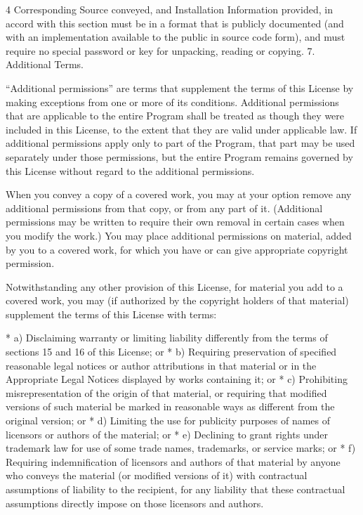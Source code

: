 \documentclass[fontsize=11pt,paper=A4,BCOR=12mm,DIV=13,open=any,listof=totoc,toc=flat]{scrbook}
\begin{document}
{\begin{multicols}{4}
Corresponding Source conveyed, and Installation Information provided, in accord with this section must be in a format that is publicly documented (and with an implementation available to the public in source code form), and must require no special password or key for unpacking, reading or copying.
7. Additional Terms.

“Additional permissions” are terms that supplement the terms of this License by making exceptions from one or more of its conditions. Additional permissions that are applicable to the entire Program shall be treated as though they were included in this License, to the extent that they are valid under applicable law. If additional permissions apply only to part of the Program, that part may be used separately under those permissions, but the entire Program remains governed by this License without regard to the additional permissions.

When you convey a copy of a covered work, you may at your option remove any additional permissions from that copy, or from any part of it. (Additional permissions may be written to require their own removal in certain cases when you modify the work.) You may place additional permissions on material, added by you to a covered work, for which you have or can give appropriate copyright permission.

Notwithstanding any other provision of this License, for material you add to a covered work, you may (if authorized by the copyright holders of that material) supplement the terms of this License with terms:

    * a) Disclaiming warranty or limiting liability differently from the terms of sections 15 and 16 of this License; or
    * b) Requiring preservation of specified reasonable legal notices or author attributions in that material or in the Appropriate Legal Notices displayed by works containing it; or
    * c) Prohibiting misrepresentation of the origin of that material, or requiring that modified versions of such material be marked in reasonable ways as different from the original version; or
    * d) Limiting the use for publicity purposes of names of licensors or authors of the material; or
    * e) Declining to grant rights under trademark law for use of some trade names, trademarks, or service marks; or
    * f) Requiring indemnification of licensors and authors of that material by anyone who conveys the material (or modified versions of it) with contractual assumptions of liability to the recipient, for any liability that these contractual assumptions directly impose on those licensors and authors.


\end{multicols}}
\end{document}
